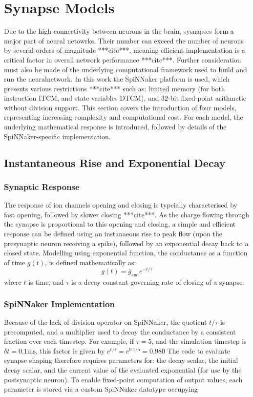 \documentclass[12pt]{article}
\begin{document}
\section{Synapse Models}
Due to the high connectivity between neurons in the brain, sysnapses form a
major part of neural netowrks. Their number can exceed the number of neurons by
several orders of magnitude ***cite***, meaning efficient implementation is a
critical factor in overall network performance ***cite***. Further consideration
must also be made of the underlying computational framework used to build and
run the neuralnetwork. In this work the SpiNNaker platform is used, which
presents various restrictions ***cite*** such as: limited memory (for both
instruction ITCM, and state variables DTCM), and 32-bit fixed-point arithmetic
without division support. This section covers the introduction of four models,
representing increasing complexity and computational cost. For each model, the
underlying mathematical response is introduced, followed by details of the
SpiNNaker-specific implementation.

\subsection{Instantaneous Rise and Exponential Decay}
\subsubsection*{Synaptic Response}
The response of ion channels opening and closing is typcially characterised by
fast opening, followed by slower closing ***cite***. As the charge flowing
through the synapse is proportional to this opening and closing, a simple and
efficient response can be defined using an instanaeous rise to peak flow (upon
the presynaptic neuron receiving a spike), followed by an exponential decay
back to a closed state. Modelling using exponential function, the conductance
as a function of time $g(t)$, is defined mathematically as:
\begin{equation}
g(t) = \bar{g}_{syn} e^{-t/\tau}
\end{equation}
where $t$ is time, and $\tau$ is a decay constant governing rate of closing of a
synapse.

\subsubsection*{SpiNNaker Implementation}
Because of the lack of division operator on SpiNNaker, the quotient $t/\tau$ is
precomputed, and a multiplier used to decay the conductance by a consistent
fraction over each timestep. For example, if $\tau = 5$, and the simulation
timestep is $\delta t = 0.1 \mathrm{ms}$, this factor is given by $e^{t/\tau} =
e^{0.1/5} = 0.980$
The code to evaluate synapse shaping therefore requires parameters for: the
decay scalar, the initial decay scalar, and the current value of the evaluated
exponential (for use by the postsynaptic neuron). To enable fixed-point
computation of output values, each parameter is stored via a custom SpiNNaker
datatype occupying
\end{document}
